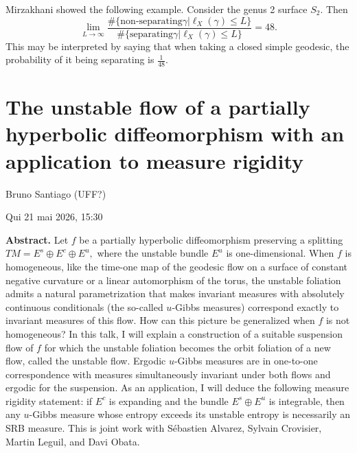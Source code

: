 Mirzakhani showed the following example.
Consider the genus 2 surface $S_2$.
Then
$$
\lim_{L \to \infty}
\frac{\#\{\text{non-separating
}\gamma|\ell_X(\gamma)\leq L\}}{
\#\{\text{separating
}\gamma|\ell_X(\gamma)\leq L\}}
=48.
$$
This may be interpreted by saying that when
taking a closed simple geodesic,
the probability of it being separating is
$\frac{1}{48}$.

\section{The unstable flow of a partially 
hyperbolic diffeomorphism with an 
application to measure rigidity}
\label{section-unstable-flow-hyp-dyn}

\noindent
Bruno Santiago (UFF?)

Qui 21 mai 2026, 15:30

\medskip\noindent
{\bf Abstract.}
Let $f$ be a partially hyperbolic
diffeomorphism preserving a splitting
$
TM = E^s \oplus E^c \oplus E^u,
$
where the unstable bundle $E^u$ is
one-dimensional.
When $f$ is homogeneous, like the time-one
map of the geodesic flow on a surface of
constant negative curvature or a linear
automorphism of the torus, the unstable
foliation admits a natural parametrization
that makes invariant measures with
absolutely continuous conditionals
(the so-called $u$-Gibbs measures)
correspond exactly to invariant measures
of this flow.
How can this picture be generalized when
$f$ is not homogeneous?
In this talk, I will explain a construction
of a suitable suspension flow of $f$ for
which the unstable foliation becomes the
orbit foliation of a new flow, called the
unstable flow.
Ergodic $u$-Gibbs measures are in
one-to-one correspondence with measures
simultaneously invariant under both flows
and ergodic for the suspension.
As an application, I will deduce the
following measure rigidity statement:
if $E^c$ is expanding and the bundle
$E^s \oplus E^u$ is integrable, then any
$u$-Gibbs measure whose entropy exceeds its
unstable entropy is necessarily an SRB
measure.
This is joint work with Sébastien
Alvarez, Sylvain Crovisier, Martin
Leguil, and Davi Obata.

